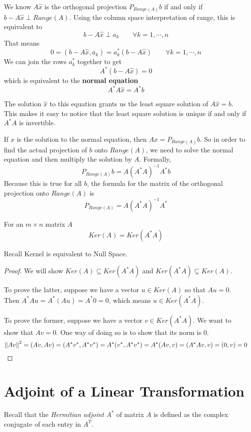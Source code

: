 We know $A \hat{x}$ is the orthogonal projection $P_{Range(A)} b$ if and only if $b - A \hat{x} \perp Range(A)$. Using the column space interpretation of range, this is equivalent to 
$$b - A \hat{x} \perp a_{k} \qquad \forall k = 1, \cdots, n$$
That means 
$$0 = (b - A \hat{x}, a_{k}) = a^{*}_{k} (b - A \hat{x}) \qquad \forall k = 1, \cdots, n$$ 
We can join the rows $a^{*}_{k}$ together to get
$$A^{*} (b - A \hat{x}) = 0$$
which is equivalent to the \textbf{normal equation} 
$$A^{*} A \hat{x} = A^{*} b$$

The solution $\hat{x}$ to this equation grants us the least square solution of $A \hat{x} = b$. This makes it easy to notice that the least square solution is unique if and only if $A^{*} A$ is invertible. 

If $\hat{x}$ is the solution to the normal equation, then $A \hat{x} = P_{Range(A)} b$. So in order to find the actual projection of $b$ onto $Range(A)$, we need to solve the normal equation and then multiply the solution by $A$. Formally, 
$$P_{Range(A)} b = A (A^{*} A)^{-1} A^{*} b$$
Because this is true for all $b$, the formula for the matrix of the orthogonal projection onto $Range(A)$ is 
$$P_{Range(A)} = A (A^{*} A)^{-1} A^{*}$$

\begin{theorem}
For an $m \times n$ matrix $A$ 
$$Ker(A) = Ker(A^{*}A)$$

Recall Kernel is equivalent to Null Space.
\end{theorem}

\begin{proof}
We will show $Ker(A) \subseteq Ker(A^{*} A)$ and $Ker(A^{*} A) \subseteq Ker(A)$. 

To prove the latter, suppose we have a vector $u \in Ker(A)$ so that $Au = 0$. Then $A^{*} A u = A^{*} (Au) = A^{*} 0 = 0$, which means $u \in Ker(A^{*} A)$. 

To prove the former, suppose we have a vector $v \in Ker(A^{*} A)$. We want to show that $Av = 0$. One way of doing so is to show that its norm is 0. 
$$\norm{Av}^{2} = (Av, Av) = (A^{*} v^{*}, A^{*} v^{*}) = A^{*} (v^{*}, A^{*} v^{*}) = A^{*} (Av, v) = (A^{*} Av, v) = (0, v) = 0$$
\end{proof}

\section{Adjoint of a Linear Transformation} 
Recall that the \textit{Hermitian adjoint} $A^{*}$ of matrix $A$ is defined as the complex conjugate of each entry in $A^{T}$. 

